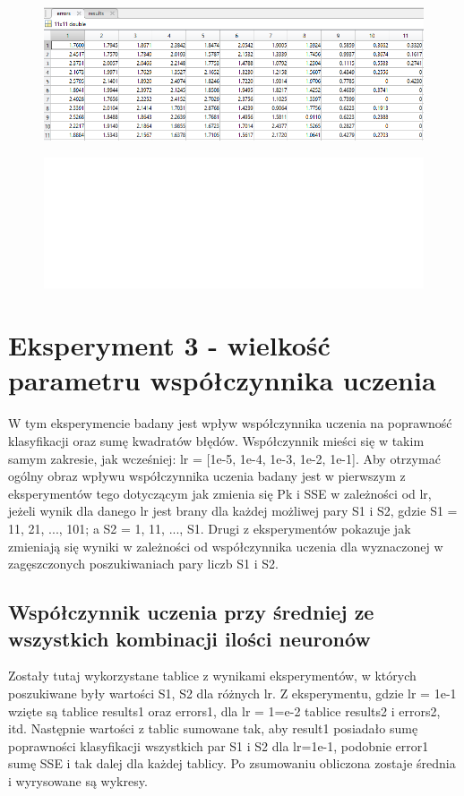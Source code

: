 \documentclass[a4paper, 12pt]{report}
\begin{document}
\begin{figure}[hbt!]
\includegraphics[width=14cm]{s1s2 sse dane}
\centering
\end{figure}

\begin{figure}[hbt!]
\includegraphics[width=22cm]{puste}
\centering
\end{figure}
  

\newpage
\section{Eksperyment 3 - wielkość parametru współczynnika uczenia}
W tym eksperymencie badany jest wpływ współczynnika uczenia na poprawność klasyfikacji oraz sumę kwadratów błędów. Współczynnik mieści się w takim samym zakresie, jak wcześniej: lr = [1e-5, 1e-4, 1e-3, 1e-2, 1e-1]. Aby otrzymać ogólny obraz wpływu współczynnika uczenia badany jest w pierwszym z eksperymentów tego dotyczącym jak zmienia się Pk i SSE w zależności od lr, jeżeli wynik dla danego lr jest brany dla każdej możliwej pary S1 i S2, gdzie S1 = 11, 21, ..., 101; a S2 = 1, 11, ..., S1. Drugi z eksperymentów pokazuje jak zmieniają się wyniki w zależności od współczynnika uczenia dla wyznaczonej w zagęszczonych poszukiwaniach pary liczb S1 i S2.

\subsection{Współczynnik uczenia przy średniej ze wszystkich kombinacji ilości neuronów}
Zostały tutaj wykorzystane tablice z wynikami eksperymentów, w których poszukiwane były wartości S1, S2 dla różnych lr. Z eksperymentu, gdzie lr = 1e-1 wzięte są tablice results1 oraz errors1, dla lr = 1=e-2 tablice results2 i errors2, itd. Następnie wartości z tablic sumowane tak, aby result1 posiadało sumę poprawności klasyfikacji wszystkich par S1 i S2 dla lr=1e-1, podobnie error1 sumę SSE i tak dalej dla każdej tablicy. Po zsumowaniu obliczona zostaje średnia i wyrysowane są wykresy.
\end{document}
